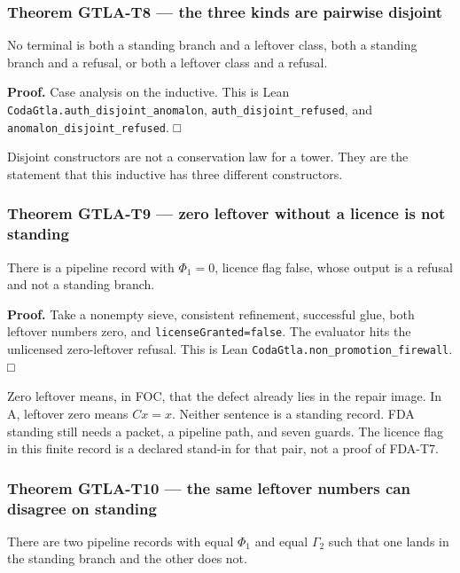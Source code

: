\documentclass[
  11pt,
]{article}
\begin{document}
\subsubsection{Theorem GTLA-T8 --- the three kinds are pairwise disjoint}\label{theorem-gtla-t8-the-three-kinds-are-pairwise-disjoint}

No terminal is both a standing branch and a leftover class, both a standing branch and a refusal, or both a leftover class and a refusal.

\textbf{Proof.} Case analysis on the inductive. This is Lean \nolinkurl{CodaGtla.auth_disjoint_anomalon}, \nolinkurl{auth_disjoint_refused}, and \nolinkurl{anomalon_disjoint_refused}. □

Disjoint constructors are not a conservation law for a tower. They are the statement that this inductive has three different constructors.

\subsubsection{Theorem GTLA-T9 --- zero leftover without a licence is not standing}\label{theorem-gtla-t9-zero-leftover-without-a-licence-is-not-standing}

There is a pipeline record with \(\Phi_1=0\), licence flag false, whose output is a refusal and not a standing branch.

\textbf{Proof.} Take a nonempty sieve, consistent refinement, successful glue, both leftover numbers zero, and \texttt{licenseGranted=false}. The evaluator hits the unlicensed zero-leftover refusal. This is Lean \nolinkurl{CodaGtla.non_promotion_firewall}. □

Zero leftover means, in FOC, that the defect already lies in the repair image. In A, leftover zero means \(Cx=x\). Neither sentence is a standing record. FDA standing still needs a packet, a pipeline path, and seven guards. The licence flag in this finite record is a declared stand-in for that pair, not a proof of FDA-T7.

\subsubsection{Theorem GTLA-T10 --- the same leftover numbers can disagree on standing}\label{theorem-gtla-t10-the-same-leftover-numbers-can-disagree-on-standing}

There are two pipeline records with equal \(\Phi_1\) and equal \(\Gamma_2\) such that one lands in the standing branch and the other does not.
\end{document}
